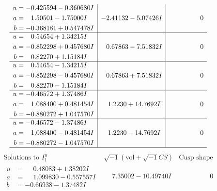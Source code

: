 \documentclass[1p]{elsarticle_modified}
\theoremstyle{definition}
\newcommand{\I}{\sqrt{-1}}
\begin{document}
$$\begin{array}{c|c|c}
\begin{aligned}
u &= -0.425594 - 0.360680 I \\
a &= \phantom{-}1.50501 - 1.75000 I \\
b &= -0.368181 + 0.547478 I\end{aligned}
 & -2.41132 - 5.07426 I & \phantom{-0.000000 } 0 \\ \hline\begin{aligned}
u &= \phantom{-}0.54654 + 1.34215 I \\
a &= -0.852298 + 0.457680 I \\
b &= \phantom{-}0.82270 + 1.15184 I\end{aligned}
 & \phantom{-}0.67863 - 7.51832 I & \phantom{-0.000000 } 0 \\ \hline\begin{aligned}
u &= \phantom{-}0.54654 - 1.34215 I \\
a &= -0.852298 - 0.457680 I \\
b &= \phantom{-}0.82270 - 1.15184 I\end{aligned}
 & \phantom{-}0.67863 + 7.51832 I & \phantom{-0.000000 } 0 \\ \hline\begin{aligned}
u &= -0.46572 + 1.37486 I \\
a &= \phantom{-}1.088400 + 0.481454 I \\
b &= -0.880272 + 1.047570 I\end{aligned}
 & \phantom{-}1.2230 + 14.7692 I & \phantom{-0.000000 } 0 \\ \hline\begin{aligned}
u &= -0.46572 - 1.37486 I \\
a &= \phantom{-}1.088400 - 0.481454 I \\
b &= -0.880272 - 1.047570 I\end{aligned}
 & \phantom{-}1.2230 - 14.7692 I & \phantom{-0.000000 } 0\\
 \hline 
 \end{array}$$\newpage$$\begin{array}{c|c|c}  
\text{Solutions to }I^u_{1}& \I (\text{vol} + \sqrt{-1}CS) & \text{Cusp shape}\\
 \hline 
\begin{aligned}
u &= \phantom{-}0.48083 + 1.38202 I \\
a &= \phantom{-}1.099830 - 0.557557 I \\
b &= -0.66938 - 1.37482 I\end{aligned}
 & \phantom{-}7.35002 - 10.49740 I & \phantom{-0.000000 } 0 \\ \hline\begin{aligned}

\end{aligned}
\end{array}$$
\end{document}
